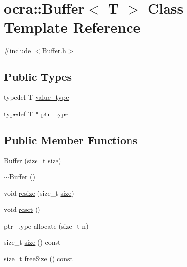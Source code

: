 \hypertarget{classocra_1_1Buffer}{}\section{ocra\+:\+:Buffer$<$ T $>$ Class Template Reference}
\label{classocra_1_1Buffer}


{\ttfamily \#include $<$Buffer.\+h$>$}

\subsection*{Public Types}
\begin{DoxyCompactItemize}
\item 
typedef T \hyperlink{classocra_1_1Buffer_ad03bef3764c265411b5b7726d94d8786}{value\+\_\+type}
\item 
typedef T $\ast$ \hyperlink{classocra_1_1Buffer_a26bf1dc373e2144eddd0dd8be4b37f84}{ptr\+\_\+type}
\end{DoxyCompactItemize}
\subsection*{Public Member Functions}
\begin{DoxyCompactItemize}
\item 
\hyperlink{classocra_1_1Buffer_a13b091b3f15fbdaadd00d87b89f0acd7}{Buffer} (size\+\_\+t \hyperlink{classocra_1_1Buffer_a181e8573c657bbc9a09a15628be00c4f}{size})
\item 
\hyperlink{classocra_1_1Buffer_ac7050b30073f9fbfbf580c1b57a34781}{$\sim$\+Buffer} ()
\item 
void \hyperlink{classocra_1_1Buffer_a171d3ec7b50688fd529c8ae3dff7b6d1}{resize} (size\+\_\+t \hyperlink{classocra_1_1Buffer_a181e8573c657bbc9a09a15628be00c4f}{size})
\item 
void \hyperlink{classocra_1_1Buffer_a3f6d6353bdb0e6eb2e577121be432f5f}{reset} ()
\item 
\hyperlink{classocra_1_1Buffer_a26bf1dc373e2144eddd0dd8be4b37f84}{ptr\+\_\+type} \hyperlink{classocra_1_1Buffer_a693db1946acad229a8e7ab84ac910301}{allocate} (size\+\_\+t n)
\item 
size\+\_\+t \hyperlink{classocra_1_1Buffer_a181e8573c657bbc9a09a15628be00c4f}{size} () const
\item 
size\+\_\+t \hyperlink{classocra_1_1Buffer_adf28f390748a3f97df43b08fb0574e6a}{free\+Size} () const
\end{DoxyCompactItemize}


